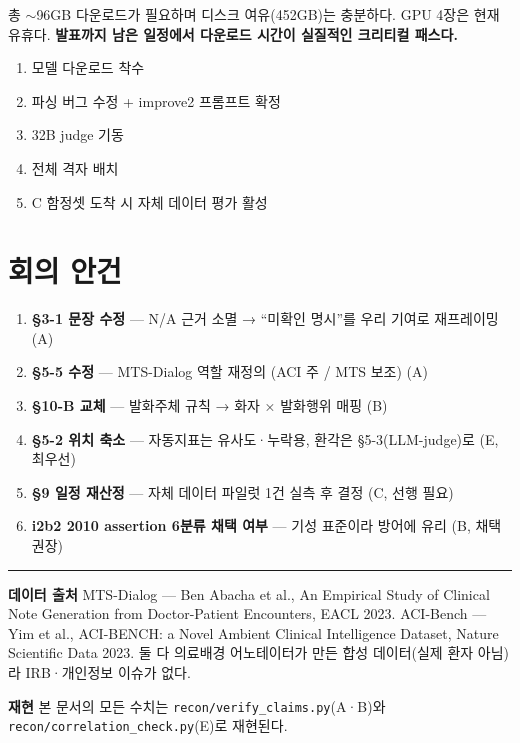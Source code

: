 \documentclass[10.5pt,a4paper]{article}
\renewcommand{\emph}[1]{{\color{muted}#1}}
\newcommand{\subhead}[1]{\par\vspace{1.0em}{\bfseries\color{navy}#1}\par\vspace{-0.15em}}
\begin{document}
총 $\sim$96GB 다운로드가 필요하며 디스크 여유(452GB)는 충분하다. GPU 4장은 현재 유휴다. \textbf{발표까지 남은 일정에서 다운로드 시간이 실질적인 크리티컬 패스다.}

\subhead{다음 순서}

\begin{enumerate}
\item 모델 다운로드 착수
\item 파싱 버그 수정 + improve2 프롬프트 확정
\item 32B judge 기동
\item 전체 격자 배치
\item C 함정셋 도착 시 자체 데이터 평가 활성
\end{enumerate}

\section{회의 안건}

\begin{enumerate}
\item \textbf{§3-1 문장 수정} — N/A 근거 소멸 → ``미확인 명시''를 우리 기여로 재프레이밍 \emph{(A)}
\item \textbf{§5-5 수정} — MTS-Dialog 역할 재정의 (ACI 주 / MTS 보조) \emph{(A)}
\item \textbf{§10-B 교체} — 발화주체 규칙 → 화자 × 발화행위 매핑 \emph{(B)}
\item \textbf{§5-2 위치 축소} — 자동지표는 유사도·누락용, 환각은 §5-3(LLM-judge)로 \emph{(E, 최우선)}
\item \textbf{§9 일정 재산정} — 자체 데이터 파일럿 1건 실측 후 결정 \emph{(C, 선행 필요)}
\item \textbf{i2b2 2010 assertion 6분류 채택 여부} — 기성 표준이라 방어에 유리 \emph{(B, 채택 권장)}
\end{enumerate}

\vspace{1.2em}
{\color{rulegray}\rule{\linewidth}{0.6pt}}

{\footnotesize
\textbf{데이터 출처} \quad MTS-Dialog — Ben Abacha et al., \emph{An Empirical Study of Clinical Note Generation from Doctor-Patient Encounters}, EACL 2023. \quad ACI-Bench — Yim et al., \emph{ACI-BENCH: a Novel Ambient Clinical Intelligence Dataset}, Nature Scientific Data 2023. 둘 다 의료배경 어노테이터가 만든 합성 데이터(실제 환자 아님)라 IRB·개인정보 이슈가 없다.

\textbf{재현} \quad 본 문서의 모든 수치는 \texttt{recon/verify\_claims.py}(A·B)와 \texttt{recon/correlation\_check.py}(E)로 재현된다.
}
\end{document}
